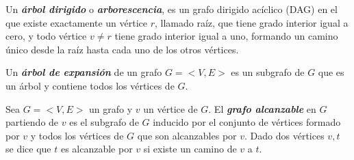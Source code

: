\begin{definition}
    Un \textbf{\textit{\'arbol dirigido}} o \textbf{\textit{arborescencia}}, es un 
    grafo dirigido acíclico (DAG) en el que existe exactamente un vértice $r$, llamado raíz, que tiene grado interior 
    igual a cero, y todo v\'ertice $v \neq r$ tiene grado interior igual a uno, formando un camino 
    único desde la raíz hasta cada uno de los otros vértices.
\end{definition}

\begin{definition}
    Un \textbf{\textit{\'arbol de expansión}} de un grafo $G=<V,E>$ es un subgrafo de $G$ que es un \'arbol 
    y contiene todos los v\'ertices de $G$.
\end{definition}


\begin{definition}
    Sea $G=<V,E>$ un grafo y $v$ un v\'ertice de $G$. El \textbf{\textit{grafo alcanzable}} en $G$ partiendo de $v$ 
    es el subgrafo de $G$ inducido por el conjunto de v\'ertices formado por $v$ y todos los v\'ertices de $G$ que 
    son alcanzables por $v$. Dado dos v\'ertices $v,t$ se dice que $t$ es alcanzable por $v$ si existe un 
    camino de $v$ a $t$.  
\end{definition}